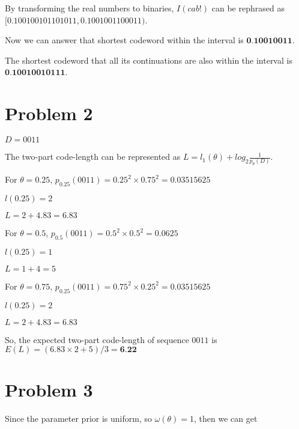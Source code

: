 \documentclass{article}
\begin{document}
\vspace{2mm}

By transforming the real numbers to binaries, $I(cab!)$ can be rephrased as $[0.100100101101011, 0.1001001100011)$.

\vspace{2mm}

Now we can answer that shortest codeword within the interval is $\textbf{0.10010011}$.

\vspace{2mm}

The shortest codeword that all its continuations are also within the interval is $\textbf{0.10010010111}$.

\section{Problem 2}

$D=0011$

\vspace{3mm}

The two-part code-length can be represented as $L=l_1(\theta)+log_2\frac{1}{p_\theta(D)}$. 

\vspace{3mm}

For $\theta=0.25$, $p_{0.25}(0011)=0.25^2\times0.75^2=0.03515625$

$l(0.25)=2$

$L=2+4.83=6.83$

\vspace{3mm}

For $\theta=0.5$, $p_{0.5}(0011)=0.5^2\times0.5^2=0.0625$

$l(0.25)=1$

$L=1+4=5$

\vspace{3mm}

For $\theta=0.75$, $p_{0.25}(0011)=0.75^2\times0.25^2=0.03515625$

$l(0.25)=2$

$L=2+4.83=6.83$

\vspace{3mm}

So, the expected two-part code-length of sequence $0011$ is $E(L)=(6.83\times2+5)/3=\textbf{6.22}$

\section{Problem 3}

Since the parameter prior is uniform, so $\omega(\theta)=1$, then we can get
\end{document}
